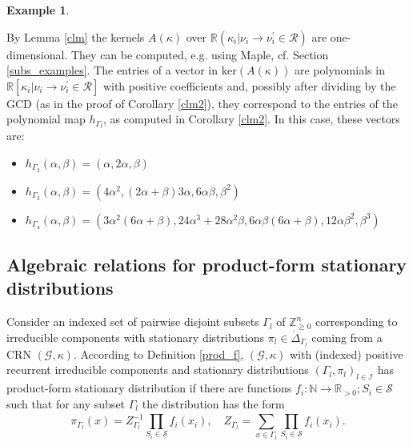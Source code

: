 \documentclass{amsart}
\theoremstyle{definition}
\newtheorem{example}[theorem]{Example}
\theoremstyle{remark}
\theoremstyle{Conjecture/open problem}
\theoremstyle{assumption}
\theoremstyle{conjecture}
\def\a{\alpha}
\def\be{\beta}
\def\Ga{\Gamma}
\def\p{^{\prime}}
\def\k{\kappa}
\def\cR{\mathcal{R}}
\def\cS{\mathcal{S}}
\def\R{\mathbb{R}}
\def\N{\mathbb{N}}
\def\Z{\mathbb{Z}}
\numberwithin{equation}{section}
\begin{document}
\begin{example}
\begin{itemize}
\end{itemize}
By Lemma \ref{clm} the kernels $A(\k)$ over $\R(\k_i|{\nu_i\to\nu_i\p}\in\cR)$ are one-dimensional. They can be computed, e.g. using Maple, cf. Section \ref{subs_examples}. The entries of a vector in $\mathrm{ker}(A(\k))$ are polynomials in $\R[\k_i|{\nu_i\to\nu_i\p}\in\cR]$ with positive coefficients and, possibly after dividing by the GCD (as in the proof of Corollary \ref{clm2}), they correspond to the entries of the polynomial map $h_{\Ga_l}$, as computed in Corollary \ref{clm2}. In this case, these vectors are:
\begin{itemize}
\item
$h_{\Ga_2}(\a,\be)=(\a,2\a,\be)$
\item $h_{\Ga_3}(\a,\be)=(4\a^2,(2\a+\be)3\a,6\a\be,\be^2)$
\item $h_{\Ga_4}(\a,\be)=(3\a^2(6\a+\be),24\a^3+28\a^2\be,6\a\be(6\a+\be),12\a\be^2,\be^3)$
\end{itemize}


\end{example}




\subsection{Algebraic relations for product-form stationary distributions}\label{app_prod_fn}
Consider an indexed set of pairwise disjoint subsets $\Ga_l$ of $\Z_{\geq 0}^n$ corresponding to irreducible components with stationary distributions $\pi_l\in \mathring\Delta_{\Ga_l}$ coming from a CRN $(\mathcal{G}, \k)$. According to Definition \ref{prod_f}, $(\mathcal{G}, \k)$ with (indexed) positive recurrent irreducible components and stationary distributions $(\Ga_l,\pi_l)_{l\in \mathcal{I}}$ has product-form stationary distribution if there are functions $f_i: \N\to \R_{>0}; S_i\in \cS$ such that for any subset $\Ga_l$ the distribution has the form
$$\pi_{\Ga_l}(x)=Z_{\Ga_l}^{-1}\prod_{S_i\in\cS}^{ } f_i(x_i),\quad Z_{\Ga_l}=\sum_{x\in \Ga_l}\prod_{S_i\in\cS}^{ } f_i(x_i).$$ 
\end{document}
